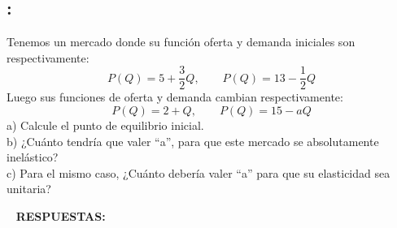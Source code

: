 \documentclass[
  letterpaper,
  DIV=11,
  numbers=noendperiod]{scrreport}
\begin{document}
\hypertarget{section-12}{%
\subsection{:}\label{section-12}}

Tenemos un mercado donde su función oferta y demanda iniciales son
respectivamente:
\[P(Q)=5+\frac{3}{2}Q, \quad \quad P(Q)=13-\frac{1}{2}Q\] Luego sus
funciones de oferta y demanda cambian respectivamente:
\[P(Q)=2+Q, \quad \quad P(Q)=15-aQ\] a) Calcule el punto de equilibrio
inicial.\\
b) ¿Cuánto tendría que valer ``a'', para que este mercado se
absolutamente inelástico?\\
c) Para el mismo caso, ¿Cuánto debería valer ``a'' para que su
elasticidad sea unitaria?

~ \textbf{RESPUESTAS:}
\end{document}
